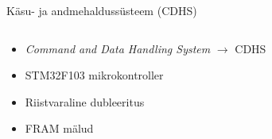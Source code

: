 \documentclass[pdf]{beamer}
\begin{document}
\begin{frame}{Käsu- ja andmehaldussüsteem (CDHS)}
	\begin{columns}
		\begin{column}{0.5\textwidth}
			\begin{itemize}
				\item \textit{Command and Data Handling System} \(\to\) CDHS
				\item STM32F103 mikrokontroller
				\item Riistvaraline dubleeritus
				\item FRAM mälud
			\end{itemize}
		\end{column}
		\begin{column}{0.5\textwidth}
		\end{column}
	\end{columns}
\end{frame}
\end{document}
